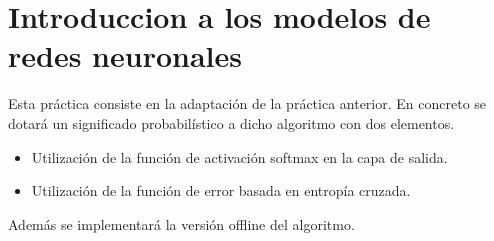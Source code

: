 \section{Introduccion a los modelos de redes neuronales}

Esta práctica consiste en la adaptación de la práctica anterior. En concreto se dotará un significado probabilístico a dicho algoritmo con dos elementos.

\begin{itemize}
\item Utilización de la función de activación softmax en la capa de salida.
\item Utilización de la función de error basada en entropía cruzada.
\end{itemize}
Además se implementará la versión offline del algoritmo.
